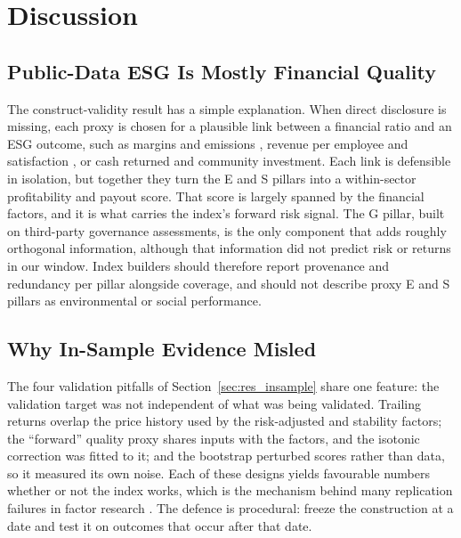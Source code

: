 \section{Discussion}
\label{sec:discussion}

\subsection{Public-Data ESG Is Mostly Financial Quality}

The construct-validity result has a simple explanation. When direct
disclosure is missing, each proxy is chosen for a plausible link between a
financial ratio and an ESG outcome, such as margins and emissions
\cite{konar2001does}, revenue per employee and satisfaction
\cite{edmans_2011}, or cash returned and community investment. Each link is
defensible in isolation, but together they turn the E and S pillars into a
within-sector profitability and payout score. That score is largely spanned
by the financial factors, and it is what carries the index's forward risk
signal. The G pillar, built on third-party governance assessments, is the
only component that adds roughly orthogonal information, although that
information did not predict risk or returns in our window. Index builders
should therefore report provenance and redundancy per pillar alongside
coverage, and should not describe proxy E and S pillars as environmental or
social performance.

\subsection{Why In-Sample Evidence Misled}

The four validation pitfalls of Section~\ref{sec:res_insample} share one
feature: the validation target was not independent of what was being
validated. Trailing returns overlap the price history used by the
risk-adjusted and stability factors; the ``forward'' quality proxy shares
inputs with the factors, and the isotonic correction was fitted to it; and
the bootstrap perturbed scores rather than data, so it measured its own
noise. Each of these designs yields favourable numbers whether or not the
index works, which is the mechanism behind many replication failures in
factor research \cite{harvey_2016, bailey_2017}. The defence is procedural:
freeze the construction at a date and test it on outcomes that occur after
that date.

